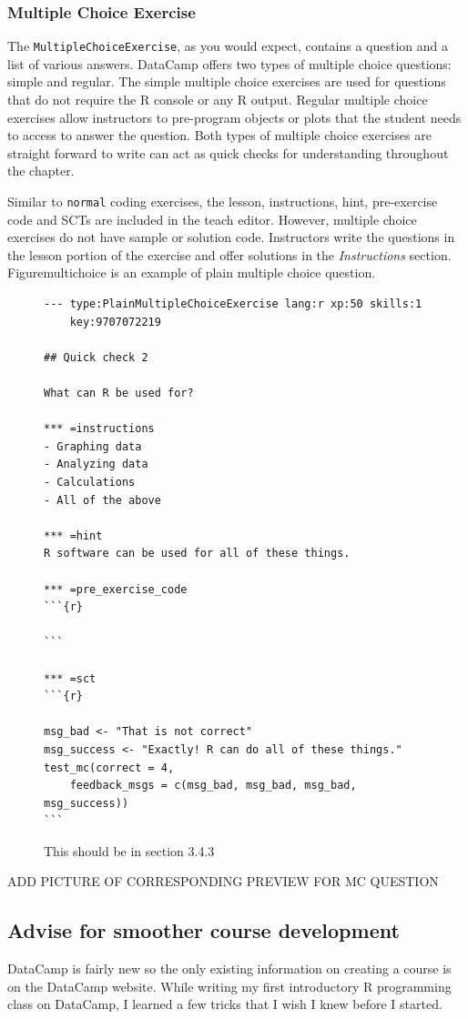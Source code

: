 \documentclass[12pt]{article}\usepackage[]{graphicx}\usepackage[]{color}
\begin{document}
\subsubsection{Multiple Choice Exercise}

The \texttt{MultipleChoiceExercise}, as you would expect, contains a question and a list of various answers. 
DataCamp offers two types of multiple choice questions: simple and regular. 
The simple multiple choice exercises are used for questions that do not require the R console or any R output. Regular multiple choice exercises 
allow instructors to pre-program objects or plots that the student needs to access to answer the question. Both types of multiple choice exercises 
are straight forward to write can act as quick checks for understanding throughout the chapter.

Similar to \texttt{normal} coding exercises, the lesson, instructions, hint, pre-exercise 
code and SCTs are included in the teach editor. However, multiple choice exercises do not have sample or solution code. 
Instructors write the questions in the lesson
portion of the exercise and offer solutions in the \textit{Instructions} section. Figuremultichoice is an example of plain multiple choice question.
\begin{figure}
\caption{This should be in section 3.4.3}
\begin{Verbatim}[frame=single]
--- type:PlainMultipleChoiceExercise lang:r xp:50 skills:1
    key:9707072219

## Quick check 2

What can R be used for?

*** =instructions
- Graphing data
- Analyzing data
- Calculations
- All of the above

*** =hint
R software can be used for all of these things.

*** =pre_exercise_code
```{r}

```

*** =sct
```{r}

msg_bad <- "That is not correct"
msg_success <- "Exactly! R can do all of these things."
test_mc(correct = 4, 
    feedback_msgs = c(msg_bad, msg_bad, msg_bad, msg_success))
```
\end{Verbatim}
\end{figure}

ADD PICTURE OF CORRESPONDING PREVIEW FOR MC QUESTION

\subsection{Advise for smoother course development}
DataCamp is fairly new so the only existing information on creating a course is on the DataCamp website. While writing my first introductory R programming class on DataCamp, I learned a few tricks that I wish I knew before I started. 
\end{document}
